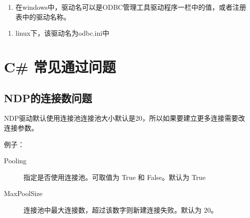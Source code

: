 \documentclass[a4,10pt,oneside,english]{sphinxmanual}
\begin{document}
\begin{sphinxVerbatim}[commandchars=\\\{\}]
\end{sphinxVerbatim}
\begin{enumerate}
%
\item {} 
在windows中，驱动名可以是ODBC管理工具驱动程序一栏中的值，或者注册表中的驱动名称。

\end{enumerate}

\begin{figure}[H]
\centering

\noindent{}
\end{figure}
\begin{enumerate}
%
\setcounter{enumi}{1}
\item {} 
linux下，该驱动名为odbc.ini中

\end{enumerate}

\begin{figure}[H]
\centering

\noindent{}
\end{figure}


\section{C\# 常见通过问题}
\label{\detokenize{interface/C_:c}}\label{\detokenize{interface/C_::doc}}

\subsection{NDP的连接数问题}
\label{\detokenize{interface/C_:ndp}}
NDP驱动默认使用连接池连接池大小默认是20，所以如果要建立更多连接需要改连接参数。

例子：
\begin{description}
\item[{Pooling}] \leavevmode
指定是否使用连接池。可取值为 True 和 False。默认为 True

\item[{MaxPoolSize}] \leavevmode
连接池中最大连接数，超过该数字则新建连接失败。默认为 20。

\end{description}
\end{document}
